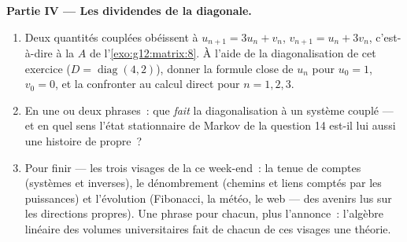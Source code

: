 \begin{problem}
\medskip
\noindent\textbf{Partie IV --- Les dividendes de la diagonale.}
\begin{enumerate}[resume]
  \item Deux quantités couplées obéissent à
        $u_{n+1} = 3u_n + v_n$, $v_{n+1} = u_n + 3v_n$,
        c'est-à-dire à la  $A$ de l'\cref{exo:g12:matrix:8}.
        À l'aide de la diagonalisation de cet exercice
        ($D = \operatorname{diag}(4, 2)$), donner la formule close
        de $u_n$ pour $u_0 = 1$, $v_0 = 0$, et la confronter au
        calcul direct pour $n = 1, 2, 3$.
  \item En une ou deux phrases~: que \emph{fait} la
        diagonalisation à un système couplé --- et en quel sens
        l'état stationnaire de Markov de la question 14 est-il lui
        aussi une histoire de  propre~?
  \item Pour finir --- les trois visages de la  ce week-end~:
        la tenue de comptes (systèmes et inverses), le dénombrement
        (chemins et liens comptés par les puissances) et l'évolution
        (Fibonacci, la météo, le web --- des avenirs lus sur les
        directions propres). Une phrase pour chacun, plus l'annonce~:
        l'algèbre linéaire des volumes universitaires fait de chacun
        de ces visages une théorie.
\end{enumerate}
\end{problem}

